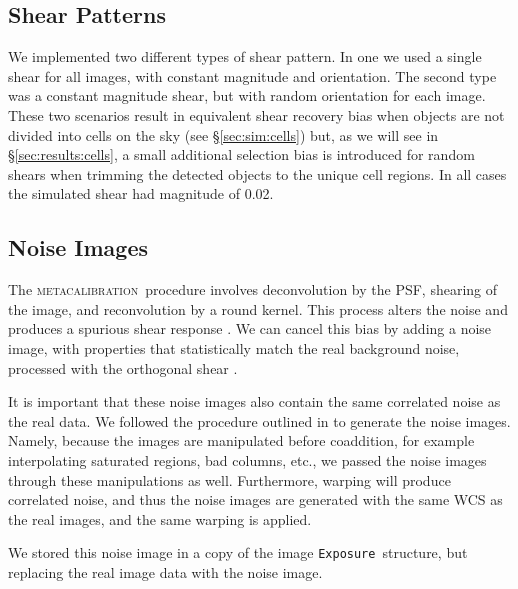 \documentclass[twocolumn,twocolappendix,astrosym]{openjournal}
\newcommand{\calexp}{\texttt{Exposure}}
\newcommand{\mcal}{\textsc{metacalibration}}
\newcommand{\mshear}{0.02}
\begin{document}
\subsection{Shear Patterns} \label{sec:sim:shears}

We implemented two different types of shear pattern.  In one we used a single
shear for all images, with constant magnitude and orientation.  The second type
was a constant magnitude shear, but with random orientation for each image.
These two scenarios result in equivalent shear recovery bias when objects are
not divided into cells on the sky (see \S \ref{sec:sim:cells}) but, as we will
see in \S \ref{sec:results:cells}, a small additional selection bias is
introduced for random shears when trimming the detected objects to the unique
cell regions.  In all cases the simulated shear had magnitude of \mshear.

\subsection{Noise Images} \label{sec:sim:noiseimages}

The \mcal\ procedure involves deconvolution by the PSF, shearing of the image,
and reconvolution by a round kernel.  This process alters the noise and
produces a spurious shear response \citep{SheldonMcal2017}.  We can cancel this
bias by adding a noise image, with properties that statistically match the real
background noise, processed with the orthogonal shear
\citep{SheldonMcal2017,mdet20}.

It is important that these noise images also contain the same correlated noise
as the real data. We followed the procedure outlined in \citet{BeckerMdetCoadd}
to generate the noise images. Namely, because the images are manipulated before
coaddition, for example interpolating saturated regions, bad columns, etc., we
passed the noise images through these manipulations as well. Furthermore,
warping will produce correlated noise, and thus the noise images are generated
with the same WCS as the real images, and the same warping is applied.

We stored this noise image in a copy of the image \calexp\ structure, but
replacing the real image data with the noise image.
\end{document}
